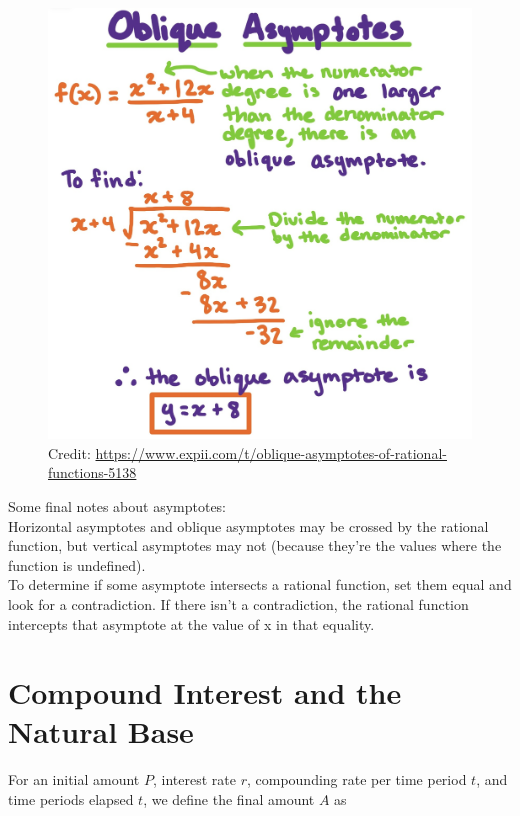 \documentclass[12pt]{article}
\begin{document}
\begin{figure}[H]
	\centering
	\includegraphics[scale=.2]{oblique.jpg}
	\caption{Credit: \url{https://www.expii.com/t/oblique-asymptotes-of-rational-functions-5138}}
\end{figure}

Some final notes about asymptotes:\\

Horizontal asymptotes and oblique asymptotes may be crossed by the rational function, but vertical asymptotes may not (because they're the values where the function is undefined).\\

To determine if some asymptote intersects a rational function, set them equal and look for a contradiction. If there isn't a contradiction, the rational function intercepts that asymptote at the value of x in that equality.\\

\section{Compound Interest and the Natural Base}

For an initial amount \(P\), interest rate \(r\), compounding rate per time period \(t\), and time periods elapsed \(t\), we define the final amount \(A\) as\\
\end{document}

